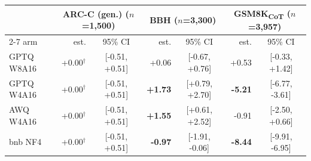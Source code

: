 \begin{tabular}{lrcrcrc}
\toprule
& \multicolumn{2}{c}{ARC-C (gen.) ($n$=1,500)} & \multicolumn{2}{c}{BBH ($n$=3,300)} & \multicolumn{2}{c}{GSM8K\textsubscript{CoT} ($n$=3,957)} \\
\cmidrule(lr){2-7}
arm & est. & 95\% CI & est. & 95\% CI & est. & 95\% CI \\
\midrule
GPTQ W8A16 & +0.00$^{\dagger}$ & [-0.51, +0.51] & +0.06 & [-0.67, +0.76] & +0.53 & [-0.33, +1.42] \\
GPTQ W4A16 & +0.00$^{\dagger}$ & [-0.51, +0.51] & \textbf{+1.73} & [+0.79, +2.70] & \textbf{-5.21} & [-6.77, -3.61] \\
AWQ W4A16 & +0.00$^{\dagger}$ & [-0.51, +0.51] & \textbf{+1.55} & [+0.61, +2.52] & -0.91 & [-2.50, +0.66] \\
bnb NF4 & +0.00$^{\dagger}$ & [-0.51, +0.51] & \textbf{-0.97} & [-1.91, -0.06] & \textbf{-8.44} & [-9.91, -6.95] \\
\bottomrule
\end{tabular}
